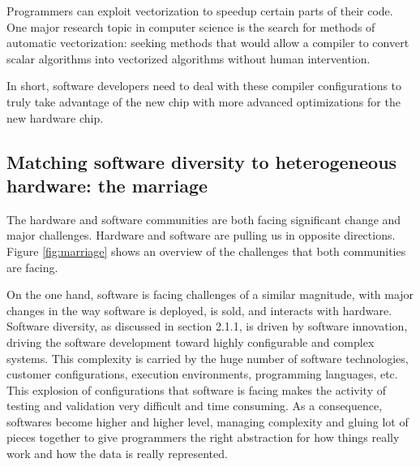 Programmers can exploit vectorization to speedup certain parts of their code. One major research topic in computer science is the search for methods of automatic vectorization: seeking methods that would allow a compiler to convert scalar algorithms into vectorized algorithms without human intervention.

In short, software developers need to deal with these compiler configurations to truly take advantage of the new chip with more advanced optimizations for the new hardware chip.









\subsection{Matching software diversity to heterogeneous hardware: the marriage}
The hardware and software communities are both facing significant change and major challenges. Hardware and software are pulling us in opposite directions. Figure \ref{fig:marriage} shows an overview of the challenges that both communities are facing.  

On the one hand, software is facing challenges of a similar magnitude, with major changes in the way software is deployed, is sold, and interacts with hardware. 
Software diversity, as discussed in section 2.1.1, is driven by software innovation, driving the software development toward highly configurable and complex systems. This complexity is carried by the huge number of software technologies, customer configurations, execution environments, programming languages, etc. This explosion of configurations that software is facing makes the activity of testing and validation very difficult and time consuming. 
As a consequence, softwares become higher and higher level, managing complexity and gluing lot of pieces together to give programmers the right abstraction for how things really work and how the data is really represented. 

